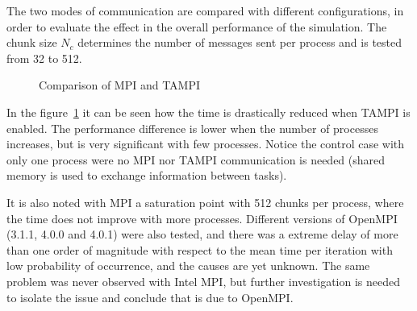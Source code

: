 The two modes of communication are compared with different configurations, in 
order to evaluate the effect in the overall performance of the simulation. The 
chunk size $N_c$ determines the number of messages sent per process and is 
tested from 32 to 512.
%
\begin{figure}%
\centering
{}
\caption{Comparison of MPI and TAMPI}
\label{fig:TAMPI}
\end{figure}%
%
In the figure~\ref{fig:TAMPI} it can be seen how the time is drastically reduced 
when TAMPI is enabled. The performance difference is lower when the number of 
processes increases, but is very significant with few processes. Notice the 
control case with only one process were no MPI nor TAMPI communication is needed 
(shared memory is used to exchange information between tasks).

It is also noted with MPI a saturation point with 512 chunks per process, where 
the time does not improve with more processes. Different versions of OpenMPI 
(3.1.1, 4.0.0 and 4.0.1) were also tested, and there was a extreme delay of more 
than one order of magnitude with respect to the mean time per iteration with low 
probability of occurrence, and the causes are yet unknown. The same problem was 
never observed with Intel MPI, but further investigation is needed to isolate 
the issue and conclude that is due to OpenMPI.

